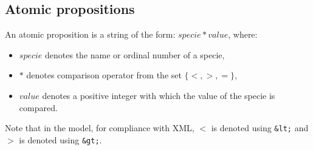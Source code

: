 \documentclass[12pt]{article}
\begin{document}
\subsection{Atomic propositions}
\label{AtomicPropositions}
An atomic proposition is a string of the form: $specie*value$, where:
\begin{itemize}
\item $specie$ denotes the name or ordinal number of a specie,
\item $*$ denotes comparison operator from the set $\{<,>,=\}$,
\item $value$ denotes a positive integer with which the value of the specie is compared.
\end{itemize}
Note that in the model, for compliance with XML, $<$ is denoted using \texttt{\&lt;} and $>$ is denoted using \texttt{\&gt;}.



\end{document}
